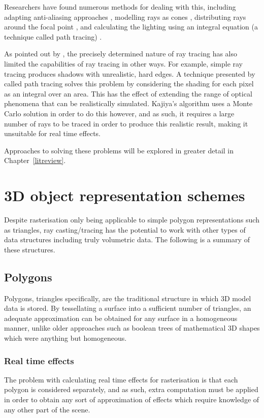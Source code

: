 Researchers have found numerous methods for dealing with this, including adapting anti-aliasing approaches \parencite{laine10efficientsvos}, modelling rays as cones \parencite{amanatides84conetracing}, distributing rays around the focal point \parencite{cook84distributed}, and calculating the lighting using an integral equation (a technique called path tracing) \parencite{kajiya86therendering}.

As pointed out by \cite{cook84distributed}, the precisely determined nature of ray tracing has also limited the capabilities of ray tracing in other ways. For example, simple ray tracing produces shadows with unrealistic, hard edges. A technique presented by \cite{kajiya86therendering} called path tracing solves this problem by considering the shading for each pixel as an integral over an area. This has the effect of extending the range of optical phenomena that can be realistically simulated. Kajiya's algorithm uses a Monte Carlo solution in order to do this however, and as such, it requires a large number of rays to be traced in order to produce this realistic result, making it unsuitable for real time effects.

Approaches to solving these problems will be explored in greater detail in Chapter~\ref{litreview}.

\section{3D object representation schemes}
Despite rasterisation only being applicable to simple polygon representations such as triangles, ray casting/tracing has the potential to work with other types of data structures including truly volumetric data. The following is a summary of these structures.

\subsection{Polygons}
Polygons, triangles specifically, are the traditional structure in which 3D model data is stored. By tessellating a surface into a sufficient number of triangles, an adequate approximation can be obtained for any surface in a homogeneous manner, unlike older approaches such as boolean trees of mathematical 3D shapes \parencite{meagher81octree} which were anything but homogeneous.

\subsubsection{Real time effects}
The problem with calculating real time effects for rasterisation is that each polygon is considered separately, and as such, extra computation must be applied in order to obtain any sort of approximation of effects which require knowledge of any other part of the scene.

